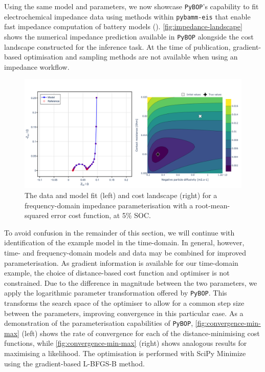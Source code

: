 \documentclass[
]{article}
\begin{document}
Using the same model and parameters, we now showcase \texttt{PyBOP}'s
capability to fit electrochemical impedance data using methods within
\texttt{pybamm-eis} that enable fast impedance computation of battery
models ().
\autoref{fig:impedance-landscape} shows the numerical impedance
prediction available in \texttt{PyBOP} alongside the cost landscape
constructed for the inference task. At the time of publication,
gradient-based optimisation and sampling methods are not available when
using an impedance workflow.

\begin{figure}
\centering
\includegraphics[width=1\textwidth,height=\textheight]{figures/joss/impedance.png}
\caption{The data and model fit (left) and cost landscape (right) for a
frequency-domain impedance parameterisation with a root-mean-squared
error cost function, at 5\% SOC. \label{fig:impedance-landscape}}
\end{figure}

To avoid confusion in the remainder of this section, we will continue
with identification of the example model in the time-domain. In general,
however, time- and frequency-domain models and data may be combined for
improved parameterisation. As gradient information is available for our
time-domain example, the choice of distance-based cost function and
optimiser is not constrained. Due to the difference in magnitude between
the two parameters, we apply the logarithmic parameter transformation
offered by \texttt{PyBOP}. This transforms the search space of the
optimiser to allow for a common step size between the parameters,
improving convergence in this particular case. As a demonstration of the
parameterisation capabilities of \texttt{PyBOP},
\autoref{fig:convergence-min-max} (left) shows the rate of convergence
for each of the distance-minimising cost functions, while
\autoref{fig:convergence-min-max} (right) shows analogous results for
maximising a likelihood. The optimisation is performed with SciPy
Minimize using the gradient-based L-BFGS-B method.
\end{document}
